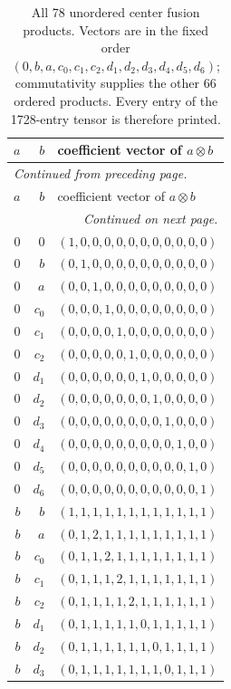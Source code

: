 \begingroup\small
\setlength{\tabcolsep}{5pt}
\begin{longtable}{rrl}
\caption{All 78 unordered center fusion products. Vectors are in the fixed order $(0,b,a,c_0,c_1,c_2,d_1,d_2,d_3,d_4,d_5,d_6)$; commutativity supplies the other 66 ordered products. Every entry of the 1728-entry tensor is therefore printed.}\label{expphysics:fusion-complete}\\
\toprule
$a$ & $b$ & coefficient vector of $a\otimes b$\\
\midrule
\endfirsthead
\multicolumn{3}{l}{\small\itshape Continued from preceding page.}\\
\toprule
$a$ & $b$ & coefficient vector of $a\otimes b$\\
\midrule
\endhead
\midrule
\multicolumn{3}{r}{\small\itshape Continued on next page.}\\
\endfoot
\bottomrule
\endlastfoot
$0$ & $0$ & $(1,0,0,0,0,0,0,0,0,0,0,0)$\\
$0$ & $b$ & $(0,1,0,0,0,0,0,0,0,0,0,0)$\\
$0$ & $a$ & $(0,0,1,0,0,0,0,0,0,0,0,0)$\\
$0$ & $c_{0}$ & $(0,0,0,1,0,0,0,0,0,0,0,0)$\\
$0$ & $c_{1}$ & $(0,0,0,0,1,0,0,0,0,0,0,0)$\\
$0$ & $c_{2}$ & $(0,0,0,0,0,1,0,0,0,0,0,0)$\\
$0$ & $d_{1}$ & $(0,0,0,0,0,0,1,0,0,0,0,0)$\\
$0$ & $d_{2}$ & $(0,0,0,0,0,0,0,1,0,0,0,0)$\\
$0$ & $d_{3}$ & $(0,0,0,0,0,0,0,0,1,0,0,0)$\\
$0$ & $d_{4}$ & $(0,0,0,0,0,0,0,0,0,1,0,0)$\\
$0$ & $d_{5}$ & $(0,0,0,0,0,0,0,0,0,0,1,0)$\\
$0$ & $d_{6}$ & $(0,0,0,0,0,0,0,0,0,0,0,1)$\\
$b$ & $b$ & $(1,1,1,1,1,1,1,1,1,1,1,1)$\\
$b$ & $a$ & $(0,1,2,1,1,1,1,1,1,1,1,1)$\\
$b$ & $c_{0}$ & $(0,1,1,2,1,1,1,1,1,1,1,1)$\\
$b$ & $c_{1}$ & $(0,1,1,1,2,1,1,1,1,1,1,1)$\\
$b$ & $c_{2}$ & $(0,1,1,1,1,2,1,1,1,1,1,1)$\\
$b$ & $d_{1}$ & $(0,1,1,1,1,1,0,1,1,1,1,1)$\\
$b$ & $d_{2}$ & $(0,1,1,1,1,1,1,0,1,1,1,1)$\\
$b$ & $d_{3}$ & $(0,1,1,1,1,1,1,1,0,1,1,1)$\\

\end{longtable}
